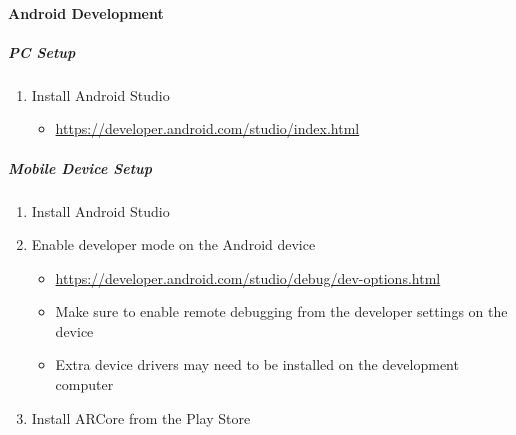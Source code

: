 \paragraph{Android Development}

\subparagraph{PC Setup}
\begin{enumerate}
    \item Install Android Studio
    \begin{itemize}
        \item \url{https://developer.android.com/studio/index.html}
    \end{itemize}

\end{enumerate}

\subparagraph{Mobile Device Setup}
\begin{enumerate}
    \item Install Android Studio
    \item Enable developer mode on the Android device
    \begin{itemize}
        \item \url{https://developer.android.com/studio/debug/dev-options.html}
        \item Make sure to enable remote debugging from the developer settings on the device
        \item Extra device drivers may need to be installed on the development computer
    \end{itemize}

    \item Install ARCore from the Play Store
\end{enumerate}